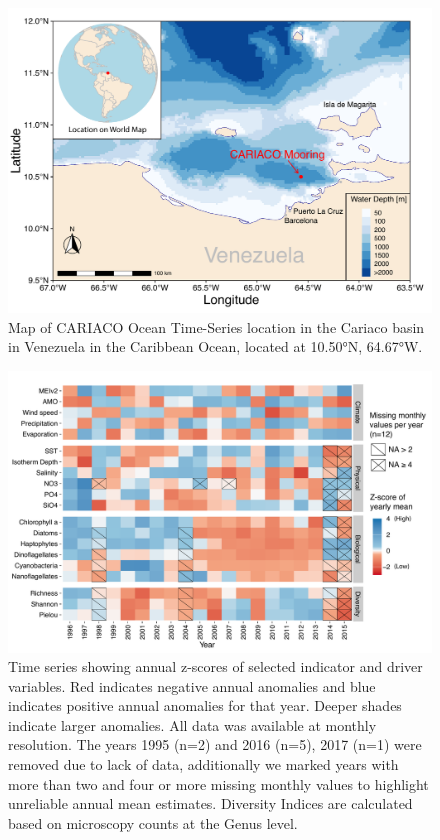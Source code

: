 \documentclass[draft]{agujournal2019}
\begin{document}
\begin{figure}
\noindent\includegraphics[width=\textwidth]{fig/Map_CAR.pdf}
\caption{Map of CARIACO Ocean Time-Series location in the Cariaco basin in Venezuela in the Caribbean Ocean, located at \ang{10.50}N, \ang{64.67}W.}
\label{fig:map}
\end{figure}

\begin{figure}
\noindent\includegraphics[width=\textwidth]{fig/Figure2_ZScores_v2.pdf}
\caption{Time series showing annual z-scores of selected indicator and driver variables. Red indicates negative annual anomalies and blue indicates positive annual anomalies for that year. Deeper shades indicate larger anomalies. All data was available at monthly resolution. The years 1995 (n=2) and 2016 (n=5), 2017 (n=1) were removed due to lack of data, additionally we marked years with more than two and four or more missing monthly values to highlight unreliable annual mean estimates. Diversity Indices are calculated based on microscopy counts at the Genus level.}
\label{fig:zscore}
\end{figure}
\end{document}
